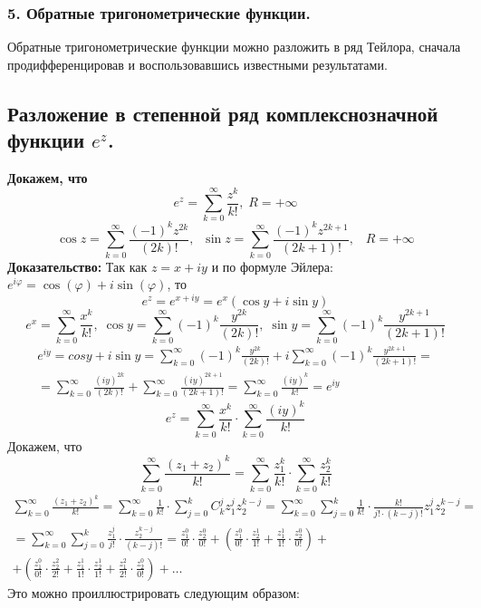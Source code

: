 \documentclass[a4paper,12pt]{article} %
\newcommand{\ryad}{\sum\limits^{\infty}_{k = 0}}
\begin{document}
\subsubsection*{5. Обратные тригонометрические функции.}
Обратные тригонометрические функции можно разложить в ряд Тейлора, сначала продифференцировав и воспользовавшись известными результатами.
\subsection{Разложение в степенной ряд комплекснозначной функции $e^z$.}
\textbf{Докажем, что} 
$$
e^z = \ryad \frac{z^k}{k!}, \; R = + \infty
$$
$$
\cos z = \ryad \frac{(-1)^k z^{2k}}{(2k)!}, \;\; \sin z = \ryad \frac{(-1)^k z^{2k + 1}}{(2k + 1)!}, \;\;\; R = + \infty
$$
\textbf{Доказательство:}
Так как $z = x + iy$ и по формуле Эйлера: $e^{i \varphi} = \cos(\varphi) + i \sin(\varphi)$, то 
$$
e^z = e^{x + iy} = e^x \left( \cos y + i \sin y \right)
$$
$$
e^x = \ryad \frac{x^k}{k!}, \; \cos y = \ryad (-1)^k \frac{y^{2k}}{(2k)!}, \; \sin y = \ryad (-1)^k \frac{y^{2k + 1}}{(2k + 1)!}
$$
\begin{multline*}
e^{iy} = cos y + i \sin y = \ryad (-1)^k \frac{y^{2k}}{(2k)!} + i \ryad (-1)^k \frac{y^{2k + 1}}{(2k + 1)!} =  \\ = \ryad \frac{(iy)^{2k}}{(2k)!} + \ryad \frac{(iy)^{2k + 1}}{(2k + 1)!} = \ryad \frac{(iy)^{k}}{k!} = e^{iy}
\end{multline*}
$$
e^z = \ryad \frac{x^k}{k!} \cdot \ryad \frac{(iy)^{k}}{k!}
$$
Докажем, что
$$
\ryad \frac{(z_1 + z_2)^k}{k!} = \ryad \frac{z_1^k}{k!} \cdot \ryad \frac{z_2^k}{k!}
$$
\begin{multline*}
\ryad \frac{(z_1 + z_2)^k}{k!} = \ryad \frac{1}{k!} \cdot \sum\limits_{j = 0}^k C_k^j z_1^j z_2^{k - j} = \ryad  \sum\limits_{j = 0}^k \frac{1}{k!} \cdot \frac{k!}{j! \cdot (k - j)!} z_1^j z_2^{k - j} = \\ = \ryad  \sum\limits_{j = 0}^k \frac{z_1^j}{j!} \cdot \frac{z_2^{k - j}}{(k - j)!} = \frac{z_1^0}{0!} \cdot \frac{z_2^0}{0!} + \left(\frac{z_1^0}{0!} \cdot \frac{z_2^1}{1!} + \frac{z_1^1}{1!} \cdot \frac{z_2^0}{0!} \right) + \\ + \left( \frac{z_1^0}{0!} \cdot \frac{z_2^2}{2!} + \frac{z_1^1}{1!} \cdot \frac{z_2^1}{1!} + \frac{z_1^2}{2!} \cdot \frac{z_2^0}{0!} \right) + \ldots
\end{multline*}
Это можно проиллюстрировать следующим образом:
\end{document}
